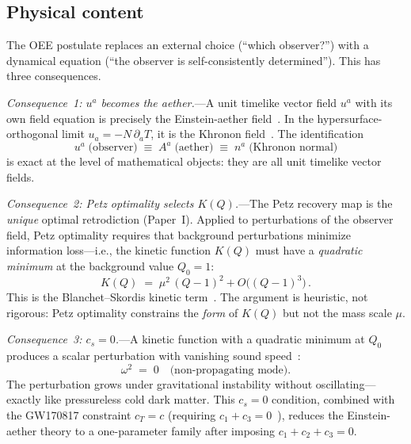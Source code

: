 \documentclass[prd,twocolumn,superscriptaddress,longbibliography,floatfix]{revtex4-2}
\begin{document}
\subsection{Physical content}

The OEE postulate replaces an external choice
(``which observer?'') with a dynamical equation
(``the observer is self-consistently determined'').
This has three consequences.

\emph{Consequence~1: $u^a$ becomes the aether.}---A
unit timelike vector field $u^a$ with its own field
equation is precisely the Einstein-aether
field~\cite{Jacobson2004}.  In the hypersurface-orthogonal
limit $u_a = -N\,\partial_a T$, it is the Khronon
field~\cite{Jacobson2010,BlanchetSkordis2024}.
The identification
\begin{equation}
u^a\;\text{(observer)} \;\equiv\; A^a\;\text{(aether)}
\;\equiv\; n^a\;\text{(Khronon normal)}
\label{eq:identification}
\end{equation}
is exact at the level of mathematical objects: they are
all unit timelike vector fields.

\emph{Consequence~2: Petz optimality selects $K(Q)$.}---The
Petz recovery map is the \emph{unique} optimal retrodiction
(Paper~I).  Applied to perturbations of the observer field,
Petz optimality requires that background perturbations
minimize information loss---i.e., the kinetic function
$K(Q)$ must have a \emph{quadratic minimum} at the
background value $Q_0 = 1$:
\begin{equation}
K(Q) \;=\; \mu^2\,(Q - 1)^2 + O\!\bigl((Q-1)^3\bigr)\,.
\label{eq:K_Q}
\end{equation}
This is the Blanchet--Skordis kinetic
term~\cite{BlanchetSkordis2024}.  The argument is
heuristic, not rigorous: Petz optimality constrains
the \emph{form} of $K(Q)$ but not the mass scale $\mu$.

\emph{Consequence~3: $c_s = 0$.}---A kinetic function with
a quadratic minimum at $Q_0$ produces a scalar perturbation
with vanishing sound speed~\cite{BlanchetSkordis2024}:
\begin{equation}
\omega^2 \;=\; 0
\quad\text{(non-propagating mode).}
\label{eq:cs_zero}
\end{equation}
The perturbation grows under gravitational instability
without oscillating---exactly like pressureless cold dark
matter.  This $c_s = 0$ condition, combined with the
GW170817 constraint $c_T = c$ (requiring
$c_1 + c_3 = 0$~\cite{GW170817}), reduces the
Einstein-aether theory to a one-parameter family
after imposing $c_1 + c_2 + c_3 = 0$.
\end{document}
